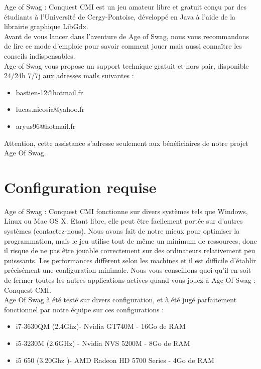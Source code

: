 Age of Swag : Conquest CMI est un jeu amateur libre et gratuit conçu par des étudiants à l'Université de Cergy-Pontoise, développé en Java à l'aide de la librairie graphique LibGdx.\\

Avant de vous lancer dans l'aventure de Age of Swag, nous vous recommandons de lire ce mode d'emploie pour savoir comment jouer mais aussi connaître les conseils indispensables.\\

Age of Swag vous propose un support technique gratuit et hors pair, disponible 24/24h 7/7j aux adresses mails suivantes :\\
  \begin{itemize}
    \item bastien-12@hotmail.fr
    \item lucas.nicosia@yahoo.fr
    \item aryus96@hotmail.fr
  \end{itemize}
    
    Attention, cette assistance s'adresse seulement aux bénéficiaires de notre projet Age Of Swag.\\

\section{Configuration requise}
Age of Swag : Conquest CMI fonctionne sur divers systèmes
tels que Windows, Linux ou Mac OS X. Etant libre, elle peut être facilement
portée sur d'autres systèmes (contactez-nous).
Nous avons fait de notre mieux pour optimiser la programmation, mais le
jeu utilise tout de même un minimum de ressources, donc il risque de ne
pas être jouable correctement sur des ordinateurs relativement peu
puisssants.
Les performances diffèrent selon les machines et il est difficile d'établir
précisément une configuration minimale. Nous vous conseillons quoi qu'il
en soit de fermer toutes les autres applications actives quand vous jouez à
Age Of Swag : Conquest CMI.\\

Age Of Swag à été testé sur divers configuration, et à été jugé parfaitement fonctionnel par notre équipe sur ces configurations :\\
  \begin{itemize}
    \item i7-3630QM (2.4Ghz)- Nvidia GT740M - 16Go de RAM
    \item i5-3230M (2.6GHz) - Nvidia NVS 5200M - 8Go de RAM
    \item i5 650 (3.20Ghz )- AMD Radeon HD 5700 Series - 4Go de RAM\\
  \end{itemize}
